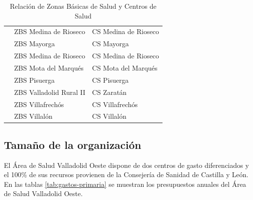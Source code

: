 \begin{table}[H]
\begin{tabular}{cll}
                                                     & ZBS Medina de Rioseco   & CS Medina de Rioseco       \\
                                                     & ZBS Mayorga             & CS Mayorga                 \\
                                                     & ZBS Medina de Rioseco   & CS Medina de Rioseco       \\
                                                     & ZBS Mota del Marqués    & CS Mota del Marqués        \\
                                                     & ZBS Pisuerga            & CS Pisuerga                \\
                                                     & ZBS Valladolid Rural II & CS Zaratán                 \\
                                                     & ZBS Villafrechós        & CS Villafrechós            \\
                                                     & ZBS Villalón            & CS Villalón                \\
        \bottomrule
    \end{tabular}
    \caption{Relación de Zonas Básicas de Salud y Centros de Salud}
    \label{tab:zonas-basicas}
\end{table}

\subsection{Tamaño de la organización}

El Área de Salud Valladolid Oeste dispone de dos centros de gasto diferenciados y el 100\% de sus recursos provienen de la Consejería de Sanidad de Castilla y León. En las tablas \ref{tab:gastos-primaria} se muestran los presupuestos anuales del Área de Salud Valladolid Oeste.

